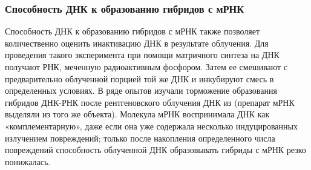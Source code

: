\documentclass[a4paper, 14pt]{article}
\renewcommand{\emph}[1]{{\color{orange}{\textit{\textbf{#1}}}}}
\begin{document}
\subsubsection{Способность ДНК к образованию гибридов с мРНК}
Способность ДНК к образованию гибридов с мРНК также позволяет количественно оценить инактивацию ДНК в результате облучения. Для проведения такого эксперимента при помощи матричного синтеза на ДНК получают РНК, меченную радиоактивным фосфором. Затем ее смешивают с предварительно облученной порцией той же ДНК и инкубируют смесь в определенных условиях. В ряде опытов изучали торможение образования гибридов ДНК-РНК после рентгеновского облучения ДНК из \emph{E.coli В} (препарат мРНК выделяли из того же объекта). Молекула мРНК воспринимала ДНК как «комплементарную», даже если она уже содержала несколько индуцированных излучением повреждений; только после накопления определенного числа повреждений способность облученной ДНК образовывать гибриды с мРНК резко понижалась.
\end{document}
